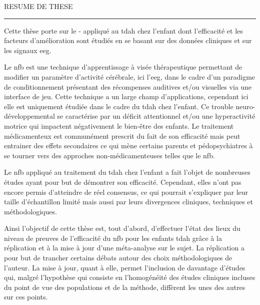 
\begin{center}
\MakeUppercase{\LARGE{R}\Large{esume de these}} \\
\vspace{0mm}
\noindent\rule{16cm}{0.4pt}
\end{center}

Cette thèse porte sur le - appliqué au \gls{tdah} chez l'enfant dont l'efficacité et les 
facteurs d'amélioration sont étudiés en se basant sur des données cliniques et sur les signaux \gls{eeg}. 

Le \gls{nfb} est une technique d'apprentissage à visée thérapeutique permettant de modifier un paramètre d'activité cérébrale, 
ici l'\gls{eeg}, dans le cadre d'un paradigme de conditionnement présentant des récompenses auditives et/ou visuelles via une 
interface de jeu. Cette technique a un large champ d'applications, cependant ici elle est uniquement étudiée dans le cadre 
du \gls{tdah} chez l'enfant. Ce trouble neuro-développemental se caractérise par un déficit attentionnel et/ou une hyperactivité 
motrice qui impactent négativement le bien-être des enfants. Le traitement médicamenteux est communément prescrit du fait 
de son efficacité mais peut entrainer des effets secondaires ce qui mène certains parents et pédopsychiatres à se tourner 
vers des approches non-médicamenteuses telles que le \gls{nfb}.
 
Le \gls{nfb} appliqué au traitement du \gls{tdah} chez l'enfant a fait l'objet de nombreuses études ayant pour but de démontrer son efficacité. 
Cependant, elles n'ont pas encore permis d'atteindre de réel consensus, ce qui pourrait s'expliquer par leur taille d'échantillon limité 
mais aussi par leurs divergences cliniques, techniques et méthodologiques. 

Ainsi l'objectif de cette thèse est, tout d'abord, d'effectuer l'état des lieux du niveau de preuves de l'efficacité 
du \gls{nfb} pour les enfants \gls{tdah} grâce à la réplication et à la mise à jour d'une méta-analyse sur le sujet. 
La réplication a pour but de trancher certains débats autour des choix méthodologiques de l'auteur. 
La mise à jour, quant à elle, permet l'inclusion de davantage d'études qui, malgré l'hypothèse qui consiste en 
l'homogénéité des études cliniques incluses du point de vue des populations et de la méthode, diffèrent les unes des autres sur ces points.  

